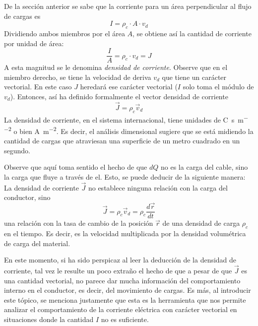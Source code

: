 De la sección anterior se sabe que la corriente para un área perpendicular al flujo de cargas es 
\[
  I=\rho_c \cdot A \cdot v_d
\]
Dividiendo ambos miembros por el área \(A\), se obtiene así la cantidad de corriente por unidad de área:
\[
  \frac{I}{A} = \rho_c \cdot v_d = J
\]
A esta magnitud se le denomina \emph{densidad de corriente}. Observe que en el miembro derecho, se tiene la velocidad de deriva \(v_d\) que tiene un carácter vectorial. En este caso \(J\) heredará ese carácter vectorial (\(I\) solo toma el módulo de \(v_d\)). Entonces, así ha definido formalmente el vector densidad de corriente 
\begin{equation}\label{eq_densidad_de_corriente}
  \vec{J}=\rho_c \vec{v}_d
\end{equation}
La densidad de corriente, en el sistema internacional, tiene unidades de \unit{\coulomb\per\second\per\metre\squared} o bien \unit{\ampere\per\metre\squared}. Es decir, el análisis dimensional sugiere que se está midiendo la cantidad de cargas que atraviesan una superficie de un metro cuadrado en un segundo. 

\begin{tcolorbox}[myconclusion]
  Observe que aquí toma sentido el hecho de que \(dQ\) no es la carga del cable, sino la carga que fluye a través de el. Esto, se puede deducir de la siguiente manera: La densidad de corriente \(\vec{J}\) no establece ninguna relación con la carga del conductor, sino 
  \[
    \vec{J}=\rho_c \vec{v}_d = \rho_c\frac{d\vec{r}}{dt}
  \]
  una relación con la tasa de cambio de la posición \(\vec{r}\) de una densidad de carga \(\rho_c\) en el tiempo. Es decir, es la velocidad multiplicada por la densidad volumétrica de carga del material.
\end{tcolorbox}

En este momento, si ha sido perspicaz al leer la deducción de la densidad de corriente, tal vez le resulte un poco extraño el hecho de que a pesar de que \(\vec{J}\) es una cantidad vectorial, no parece dar mucha información del comportamiento interno en el conductor, es decir, del movimiento de cargas. Es más, al introducir este tópico, se menciona justamente que esta es la herramienta que nos permite analizar el comportamiento de la corriente eléctrica con carácter vectorial en situaciones donde la cantidad \(I\) no es suficiente.

